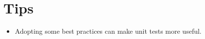 \documentclass{article}
\begin{document}
\sloppy
\section{Tips}
\begin{itemize}
    \item Adopting some best practices can make unit tests more useful.
\end{itemize}
\end{document}
